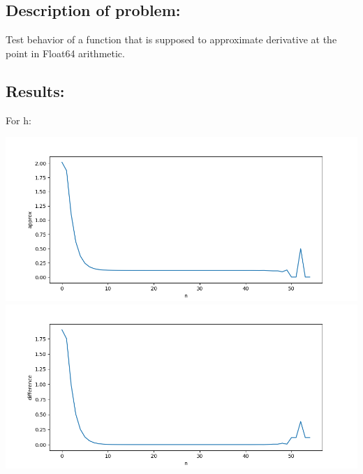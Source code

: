 \documentclass{article}
\begin{document}
\subsection*{Description of problem:}
Test behavior of a function that is supposed to approximate derivative at the point in Float64 arithmetic.

\subsection*{Results:}
For h:
\begin{center}
    \includegraphics[scale=0.5]{h_approximation} 
    \includegraphics[scale=0.5]{h_difference} 
\end{center}
\end{document}
